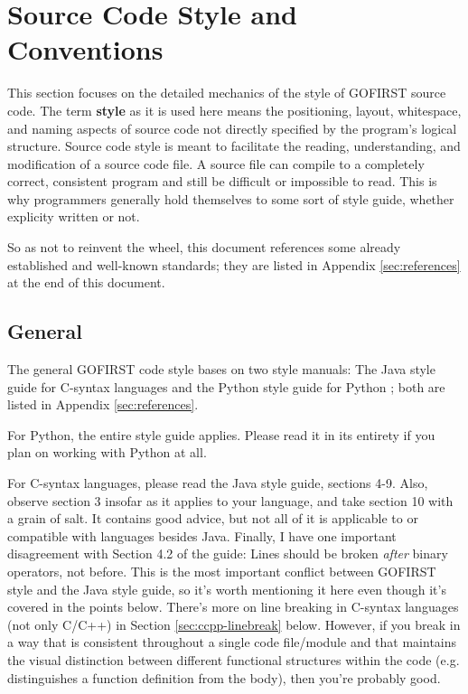 \documentclass[12pt]{article}
\newcommand{\textdef}[1]{\textbf{#1}}
\begin{document}
\section{Source Code Style and Conventions}
\label{sec:codestyle}
This section focuses on the detailed mechanics of the style of GOFIRST source code. The term \textdef{style} as it is used here means the positioning, layout, whitespace, and naming aspects of source code not directly specified by the program's logical structure. Source code style is meant to facilitate the reading, understanding, and modification of a source code file. A source file can compile to a completely correct, consistent program and still be difficult or impossible to read. This is why programmers generally hold themselves to some sort of style guide, whether explicity written or not.

So as not to reinvent the wheel, this document references some already established and well-known standards; they are listed in Appendix \ref{sec:references} at the end of this document.

\subsection{General}
The general GOFIRST code style bases on two style manuals: The Java style guide for C-syntax languages \cite{javacon} and the Python style guide for Python \cite{pyguide}; both are listed in Appendix \ref{sec:references}.

For Python, the entire style guide applies. Please read it in its entirety if you plan on working with Python at all.

For C-syntax languages, please read the Java style guide, sections 4-9. Also, observe section 3 insofar as it applies to your language, and take section 10 with a grain of salt. It contains good advice, but not all of it is applicable to or compatible with languages besides Java. Finally, I have one important disagreement with Section 4.2 of the guide: Lines should be broken \emph{after} binary operators, not before. This is the most important conflict between GOFIRST style and the Java style guide, so it's worth mentioning it here even though it's covered in the points below. There's more on line breaking in C-syntax languages (not only C/C++) in Section \ref{sec:ccpp-linebreak} below. However, if you break in a way that is consistent throughout a single code file/module and that maintains the visual distinction between different functional structures within the code (e.g. distinguishes a function definition from the body), then you're probably good.
\end{document}
